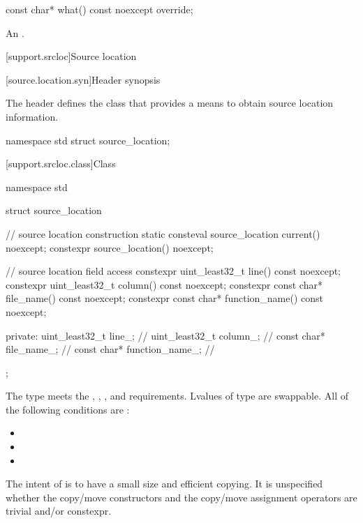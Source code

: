 %
\begin{itemdecl}
const char* what() const noexcept override;
\end{itemdecl}

\begin{itemdescr}
\pnum
\returns
An  \ntbs{}.
\end{itemdescr}

[support.srcloc]{Source location}

[source.location.syn]{Header  synopsis}

The header  defines
the class 
that provides a means to obtain source location information.

\begin{codeblock}
namespace std {
  struct source_location;
}
\end{codeblock}

[support.srcloc.class]{Class }

%
\begin{codeblock}
namespace std {
  struct source_location {
    // source location construction
    static consteval source_location current() noexcept;
    constexpr source_location() noexcept;

    // source location field access
    constexpr uint_least32_t line() const noexcept;
    constexpr uint_least32_t column() const noexcept;
    constexpr const char* file_name() const noexcept;
    constexpr const char* function_name() const noexcept;

  private:
    uint_least32_t line_;               // \expos
    uint_least32_t column_;             // \expos
    const char* file_name_;             // \expos
    const char* function_name_;         // \expos
  };
}
\end{codeblock}

\pnum
The type  meets the
,
,
, and
requirements.
Lvalues of type 
are swappable.
All of the following conditions are :
\begin{itemize}
\item {}
\item {}
\item {}
\end{itemize}
\begin{note}
The intent of  is
to have a small size and efficient copying.
It is unspecified
whether the copy/move constructors and the copy/move assignment operators
are trivial and/or constexpr.
\end{note}

